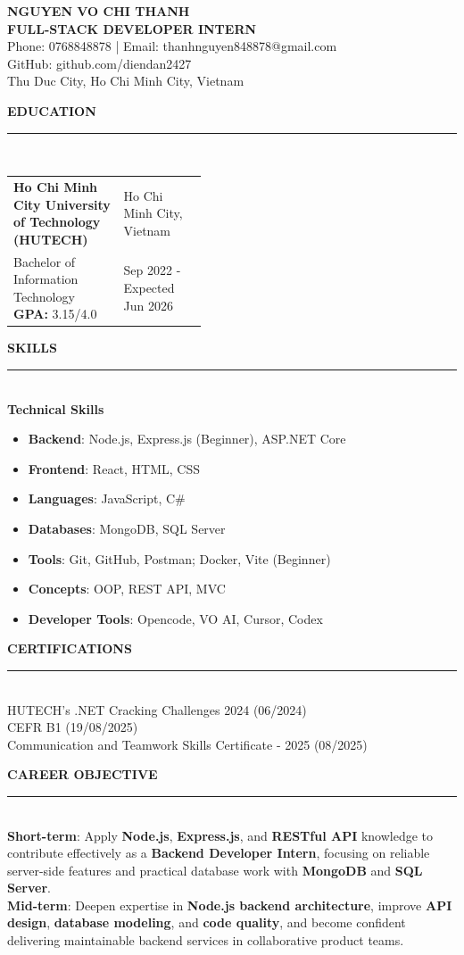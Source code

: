 \documentclass[10pt,a4paper]{article}
\newcommand{\cvsection}[1]{
  \vspace{8pt}
  {\fontsize{14}{17}\selectfont\textbf{\textcolor{headingblue}{\MakeUppercase{#1}}}}\\[-3pt]
  \textcolor{linegray}{\rule{\linewidth}{0.6pt}}\\[2pt]
}
\begin{document}
\begin{center}
	{\fontsize{31}{35}\selectfont\textbf{\textcolor{headingblue}{NGUYEN VO CHI THANH}}}\\[4pt]
	{\fontsize{14}{16}\selectfont\textbf{FULL-STACK DEVELOPER INTERN}}\\[5pt]
	{\fontsize{11.5}{13.5}\selectfont Phone: 0768848878 \;|\; Email: thanhnguyen848878@gmail.com}\\[1pt]
	{\fontsize{11.5}{13.5}\selectfont GitHub: github.com/diendan2427}\\[1pt]
	{\fontsize{11.5}{13.5}\selectfont Thu Duc City, Ho Chi Minh City, Vietnam}
\end{center}

\cvsection{Education}
\vspace{1pt}
\begin{tabularx}{\linewidth}{@{}X>{\raggedleft\arraybackslash}p{0.43\linewidth}@{}}
	\textbf{Ho Chi Minh City University of Technology (HUTECH)} & Ho Chi Minh City, Vietnam    \\[2pt]
	Bachelor of Information Technology \textbf{GPA:} 3.15/4.0   & Sep 2022 - Expected Jun 2026
\end{tabularx}
\vspace{-4pt}

\cvsection{Skills}
\textbf{Technical Skills}
\begin{itemize}
	\item \textbf{Backend}: Node.js, Express.js (Beginner), ASP.NET Core
	\item \textbf{Frontend}: React, HTML, CSS
	\item \textbf{Languages}: JavaScript, C\#
	\item \textbf{Databases}: MongoDB, SQL Server
	\item \textbf{Tools}: Git, GitHub, Postman; Docker, Vite (Beginner)
	\item \textbf{Concepts}: OOP, REST API, MVC
	\item \textbf{Developer Tools}: Opencode, VO AI, Cursor, Codex
\end{itemize}

\cvsection{Certifications}
HUTECH's .NET Cracking Challenges 2024 (06/2024)\\[2pt]
CEFR B1 (19/08/2025)\\[2pt]
Communication and Teamwork Skills Certificate - 2025 (08/2025)

\cvsection{Career Objective}
\textbf{Short-term}: Apply \textbf{Node.js}, \textbf{Express.js}, and \textbf{RESTful API} knowledge to contribute effectively as a \textbf{Backend Developer Intern}, focusing on reliable server-side features and practical database work with \textbf{MongoDB} and \textbf{SQL Server}.\\[5pt]
\textbf{Mid-term}: Deepen expertise in \textbf{Node.js backend architecture}, improve \textbf{API design}, \textbf{database modeling}, and \textbf{code quality}, and become confident delivering maintainable backend services in collaborative product teams.
\end{document}
